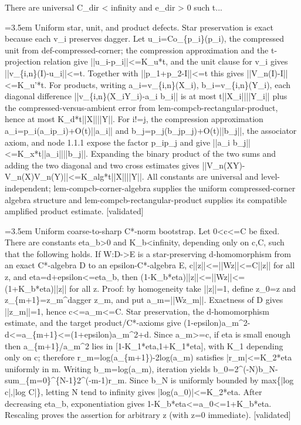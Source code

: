 \documentclass{article}
\newcommand{\step}[1]{\par\noindent\hangindent=3.5em\hangafter=1%
  \makebox[3.5em][l]{\textbf{#1.}}}
\newcommand{\steptag}[1]{\hfill{\small\textsf{[#1]}}}
\begin{document}
\begin{proofbox}{There are universal C\_dir < infinity and e\_dir > 0 such t...}
\step{1.2.2} Uniform star, unit, and product defects. Star preservation is exact because each v\_i preserves dagger. Let u\_i=Co\_\{p\_i\}(p\_i), the compressed unit from def-compressed-corner; the compression approximation and the t-projection relation give ||u\_i-p\_i||<=K\_u*t, and the unit clause for v\_i gives ||v\_\{i,n\}(I)-u\_i||<=t. Together with ||p\_1+p\_2-I||<=t this gives ||V\_n(I)-I||<=K\_u'*t. For products, writing a\_i=v\_\{i,n\}(X\_i), b\_i=v\_\{i,n\}(Y\_i), each diagonal difference ||v\_\{i,n\}(X\_iY\_i)-a\_i b\_i|| is at most t||X\_i||||Y\_i|| plus the compressed-versus-ambient error from lem-compcb-rectangular-product, hence at most K\_d*t||X||||Y||. For i!=j, the compression approximation a\_i=p\_i(a\_ip\_i)+O(t)||a\_i|| and b\_j=p\_j(b\_jp\_j)+O(t)||b\_j||, the associator axiom, and node 1.1.1 expose the factor p\_ip\_j and give ||a\_i b\_j||<=K\_x*t||a\_i||||b\_j||. Expanding the binary product of the two sums and adding the two diagonal and two cross estimates gives ||V\_n(XY)-V\_n(X)V\_n(Y)||<=K\_alg*t||X||||Y||. All constants are universal and level-independent; lem-compcb-corner-algebra supplies the uniform compressed-corner algebra structure and lem-compcb-rectangular-product supplies its compatible amplified product estimate. \steptag{validated} \\[4pt]
\step{1.2.3} Uniform coarse-to-sharp C*-norm bootstrap. Let 0<c<=C be fixed. There are constants eta\_b>0 and K\_b<infinity, depending only on c,C, such that the following holds. If W:D->E is a star-preserving d-homomorphism from an exact C*-algebra D to an epsilon-C*-algebra E, c||z||<=||Wz||<=C||z|| for all z, and eta=d+epsilon<=eta\_b, then (1-K\_b*eta)||z||<=||Wz||<=(1+K\_b*eta)||z|| for all z. Proof: by homogeneity take ||z||=1, define z\_0=z and z\_\{m+1\}=z\_m\textasciicircum{}dagger z\_m, and put a\_m=||Wz\_m||. Exactness of D gives ||z\_m||=1, hence c<=a\_m<=C. Star preservation, the d-homomorphism estimate, and the target product/C*-axioms give (1-epsilon)a\_m\textasciicircum{}2-d<=a\_\{m+1\}<=(1+epsilon)a\_m\textasciicircum{}2+d. Since a\_m>=c, if eta is small enough then a\_\{m+1\}/a\_m\textasciicircum{}2 lies in [1-K\_1*eta,1+K\_1*eta], with K\_1 depending only on c; therefore r\_m=log(a\_\{m+1\})-2log(a\_m) satisfies |r\_m|<=K\_2*eta uniformly in m. Writing b\_m=log(a\_m), iteration yields b\_0=2\textasciicircum{}(-N)b\_N-sum\_\{m=0\}\textasciicircum{}\{N-1\}2\textasciicircum{}(-m-1)r\_m. Since b\_N is uniformly bounded by max\{|log c|,|log C|\}, letting N tend to infinity gives |log(a\_0)|<=K\_2*eta. After decreasing eta\_b, exponentiation gives 1-K\_b*eta<=a\_0<=1+K\_b*eta. Rescaling proves the assertion for arbitrary z (with z=0 immediate). \steptag{validated} \\[4pt]

\end{proofbox}
\end{document}
